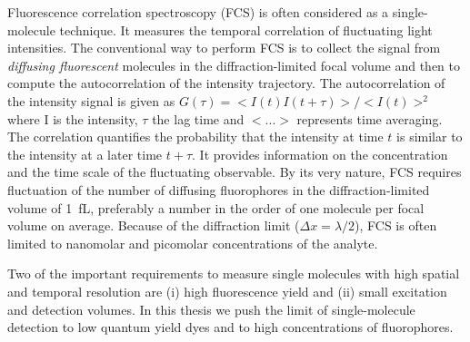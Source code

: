 Fluorescence correlation spectroscopy (FCS) is often considered as a single-molecule technique. It measures the temporal correlation of fluctuating light intensities.\cite{magde1972thermodynamic,elson1974fluorescence,krichevsky2002fluorescence}
The conventional way to perform FCS is to collect the signal from \textit{diffusing fluorescent} molecules in the diffraction-limited focal volume and then to compute the autocorrelation of the intensity trajectory.
The autocorrelation of the intensity signal is given as $G(\tau)=<I(t)I(t+\tau)>/<I(t)>^2$ where I is the intensity, $\tau$ the lag time and $<...>$ represents time averaging.
The correlation quantifies the probability that the intensity at time $t$ is similar to the intensity at a later time $t+\tau$.
It provides information on the concentration and the time scale of the fluctuating observable.
By its very nature, FCS requires fluctuation of the number of diffusing fluorophores in the diffraction-limited volume of \SI{1}{fL}, preferably a number in the order of one molecule per focal volume on average.
Because of the diffraction limit ($\Delta{x}={\lambda}/2$), FCS is often limited to nanomolar and picomolar concentrations of the analyte.

Two of the important requirements to measure single molecules with high spatial and temporal resolution are (i) high fluorescence yield and (ii) small excitation and detection volumes.
In this thesis we push the limit of single-molecule detection to low quantum yield dyes and to high concentrations of fluorophores.

